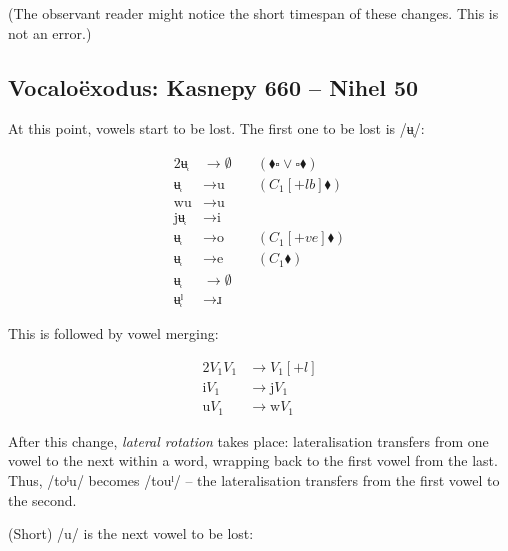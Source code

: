 \documentclass{book}
\begin{document}
(The observant reader might notice the short timespan of these changes. This is not an error.)

\subsection{Vocaloëxodus: Kasnepy 660 -- Nihel 50}

At this point, vowels start to be lost. The first one to be lost is /ʉ̜/:

\begin{alignat*}{2}
  \text{ʉ̜} &\rightarrow \emptyset &\quad(\blacklozenge \square \lor \square \blacklozenge) \\
  \text{ʉ̜} &\rightarrow \text{u} &\quad(C_1[+lb] \blacklozenge) \\
  \text{wu} &\rightarrow \text{u} \\
  \text{jʉ̜} &\rightarrow \text{i} \\
  \text{ʉ̜} &\rightarrow \text{o} &\quad(C_1[+ve] \blacklozenge) \\
  \text{ʉ̜} &\rightarrow \text{e} &\quad(C_1 \blacklozenge) \\
  \text{ʉ̜} &\rightarrow \emptyset \\
  \text{ʉ̜ˡ} &\rightarrow \text{ɹ}
\end{alignat*}

This is followed by vowel merging:

\begin{alignat*}{2}
  V_1V_1 &\rightarrow V_1[+l] \\
  \text{i} V_1 &\rightarrow \text{j} V_1 \\
  \text{u} V_1 &\rightarrow \text{w} V_1
\end{alignat*}

After this change, \emph{lateral rotation} takes place: lateralisation transfers from one vowel to the next within a word, wrapping back to the first vowel from the last. Thus, /toˡu/ becomes /touˡ/ -- the lateralisation transfers from the first vowel to the second.

(Short) /u/ is the next vowel to be lost:
\end{document}
